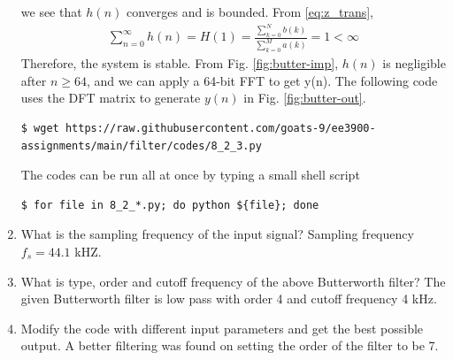 \documentclass[journal,12pt,twocolumn]{IEEEtran}
\renewcommand\thesection{\arabic{section}}
\begin{document}
\begin{enumerate}[label=\thesection.\arabic*.,ref=\thesection.\theenumi]
we see that $h(n)$ converges and is bounded. From \eqref{eq:z_trans},
\begin{align}
	\sum_{n = 0}^{\infty}h(n) = H(1) = \frac{\sum_{k = 0}^{N}b(k)}{\sum_{k = 0}^{M}a(k)} = 1 < \infty
\end{align}
Therefore, the system is stable. From
Fig. \eqref{fig:butter-imp}, $h(n)$ is negligible after $n \geq 64$, and we
can apply a 64-bit FFT to get y(n). The following code uses the DFT matrix
to generate $y(n)$ in Fig. \eqref{fig:butter-out}.
\begin{lstlisting}
$ wget https://raw.githubusercontent.com/goats-9/ee3900-assignments/main/filter/codes/8_2_3.py
\end{lstlisting}
The codes can be run all at once by typing a small shell script
\begin{lstlisting}
$ for file in 8_2_*.py; do python ${file}; done
\end{lstlisting}
\item What is the sampling frequency of the input signal?
\solution
Sampling frequency $f_s = 44.1$ kHZ.
\item
What is type, order and  cutoff frequency of the above Butterworth filter?
\solution
The given Butterworth filter is low pass with order 4 and cutoff frequency 4 kHz.
\item
Modify the code with different input parameters and get the best possible output.
\solution
A better filtering was found on setting the order of the filter to be 7.
\end{enumerate}
\end{document}
